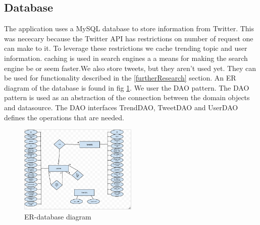 

\subsection{Database} %
\label{feedJamDatabase}
The application uses a MySQL database to store information from Twitter. This was nececary because the Twitter API has restrictions on number of request one can make to it. To leverage these restrictions we cache trending topic and user information. \citep{boka kap11} caching is used in search engines a a means for making the search engine be or seem faster.We also store tweets, but they aren't used yet. They can be used for functionality described in the \ref{furtherResearch} section. An ER diagram of the database is found in fig \ref{fig:erDiagram}.
We user the DAO pattern. The DAO pattern is used as an abstraction of the connection between the domain objects and datasource. The DAO interfaces TrendDAO, TweetDAO and UserDAO defines the operations that are needed.

\begin{figure}[ht]
    \begin{minipage}[b]{1\linewidth}
        \centering
        \includegraphics[width=0.5\textwidth]{figures/erDiagram}
        \caption{ER-database diagram}
        \label{fig:erDiagram}
    \end{minipage}
\end{figure}




